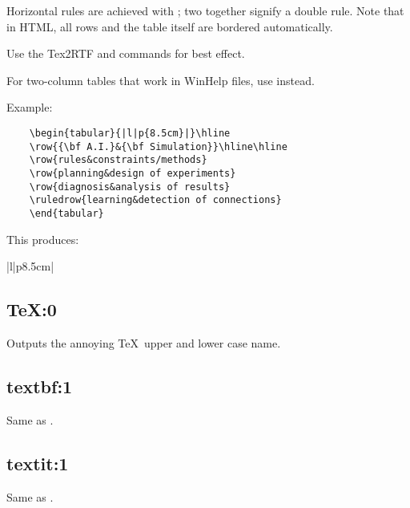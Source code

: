 Horizontal rules are achieved with ; two together
signify a double rule. Note that in HTML, all rows and the table itself are bordered
automatically.

Use the Tex2RTF  and  commands
for best effect.

For two-column tables that work in WinHelp files, use  instead.

Example:

\begin{verbatim}
    \begin{tabular}{|l|p{8.5cm}|}\hline
    \row{{\bf A.I.}&{\bf Simulation}}\hline\hline
    \row{rules&constraints/methods}
    \row{planning&design of experiments}
    \row{diagnosis&analysis of results}
    \ruledrow{learning&detection of connections}
    \end{tabular}
\end{verbatim}

This produces:

\begin{tabular}{|l|p{8.5cm}|}\hline
{}\hline\hline
{}
\end{tabular}

\subsection*{TeX:0}\label{TeX}

Outputs the annoying \TeX\ upper and lower case name.

\subsection*{textbf:1}\label{textbf}

Same as .

\subsection*{textit:1}\label{textit}

Same as .

